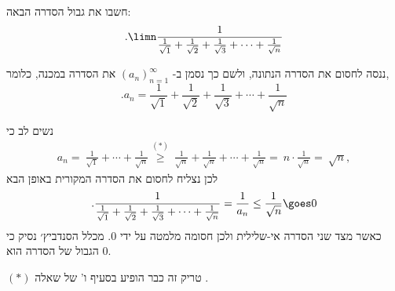 חשבו את גבול הסדרה הבאה:
\begin{equation*}
  .\limn \frac1{\frac1{\sqrt1} + \frac1{\sqrt2} + \frac1{\sqrt3} +\cdots+ \frac1{\sqrt{n}}}
\end{equation*}

\begin{solbox}
    ננסה לחסום את הסדרה הנתונה, ולשם כך
נסמן
ב-
$(a_n)_{n=1}^\infty$
את הסדרה במכנה, כלומר,
$$.a_n=\frac{1}{\sqrt{1}} + \frac{1}{\sqrt{2}} + \frac{1}{\sqrt{3}} +\cdots+ \frac{1}{\sqrt{n}}$$

נשים לב כי
\begin{align*}
a_n=\ \frac{1}{\sqrt{1}} + \cdots + \frac{1}{\sqrt{n}}
\overset{(\ast)}{\geq}\
\frac{1}{\sqrt{n}} +  \frac{1}{\sqrt{n}} + \cdots + \frac{1}{\sqrt{n}}
=\ n\cdot\frac{1}{\sqrt{n}}=\ \sqrt{n},
\end{align*}
לכן נצליח לחסום את הסדרה המקורית באופן הבא
$$.\frac1{\frac1{\sqrt1} + \frac1{\sqrt2} + \frac1{\sqrt3} +\cdots+ \frac1{\sqrt{n}}}=\frac{1}{a_n}\leq\frac{1}{\sqrt{n}}\goes0$$
כאשר מצד שני הסדרה אי-שלילית ולכן חסומה מלמטה על ידי
$0$.
מכלל הסנדביץ׳ נסיק כי הגבול של הסדרה הוא
$0$.

$(\ast)$
טריק זה כבר הופיע בסעיף ו' של שאלה .
\end{solbox}
